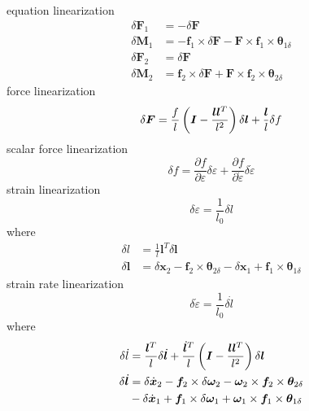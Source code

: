 \documentclass[10pt,dvips,fleqn,subeqn]{report}
\newcommand{\T}[1]{\bm{#1}}
\begin{document}
equation linearization
\begin{subequations}
\begin{align}
	\delta\T{F}_1 &= -\delta\T{F} \\
	\delta\T{M}_1 &= -\T{f}_1 \times \delta\T{F} - \T{F}\times\T{f}_1\times \T{\theta}_{1\delta} \\
	\delta\T{F}_2 &= \delta\T{F} \\
	\delta\T{M}_2 &= \T{f}_2 \times \delta\T{F} + \T{F}\times\T{f}_2\times \T{\theta}_{2\delta}
\end{align}
\end{subequations}
force linearization
\begin{equation}
	\delta\T{F} = \frac{f}{l}\plbr{\T{I} - \frac{\T{l}\T{l}^T}{l^2}} \delta\T{l} + \frac{\T{l}}{l} \delta{f}
\end{equation}
scalar force linearization
\begin{equation}
	\delta{f} = \frac{\partial{f}}{\partial\varepsilon} \delta\varepsilon
	+ \frac{\partial{f}}{\partial\dot{\varepsilon}} \delta\dot{\varepsilon}
\end{equation}
strain linearization
\begin{equation}
	\delta\varepsilon = \frac{1}{l_0}\delta{l}
\end{equation}
where
\begin{subequations}
\begin{align}
	\delta{l} &= \frac{1}{l}\T{l}^T \delta\T{l} \\
	\delta\T{l} &= \delta\T{x}_2 - \T{f}_2 \times \T{\theta}_{2\delta}
		- \delta\T{x}_1 + \T{f}_1 \times \T{\theta}_{1\delta}
\end{align}
\end{subequations}
strain rate linearization
\begin{equation}
	\delta\dot{\varepsilon} = \frac{1}{l_0} \delta\dot{l}
\end{equation}
where
\begin{subequations}
\begin{align}
	\delta\dot{l} &= \frac{\T{l}^T}{l} \delta\dot{\T{l}}
		+ \frac{\dot{\T{l}}^T}{l}\plbr{\T{I} - \frac{\T{l}\T{l}^T}{l^2}} \delta\T{l} \\
	\delta\dot{\T{l}} &= \delta\dot{\T{x}}_2
		- \T{f}_2 \times \delta\T{\omega}_2 - \T{\omega}_2 \times \T{f}_2 \times \T{\theta}_{2\delta}
		\nonumber \\
		& \mbox{} - \delta\dot{\T{x}}_1
		+ \T{f}_1 \times \delta\T{\omega}_1 + \T{\omega}_1 \times \T{f}_1 \times \T{\theta}_{1\delta}
\end{align}
\end{subequations}
\end{document}
